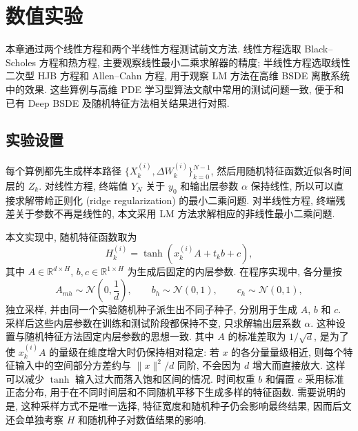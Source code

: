 
\chapter{数值实验}\label{ch:numerical}
  本章通过两个线性方程和两个半线性方程测试前文方法.
  线性方程选取 Black--Scholes 方程和热方程, 主要观察线性最小二乘求解器的精度;
  半线性方程选取线性二次型 HJB 方程和 Allen--Cahn 方程,
  用于观察 LM 方法在高维 BSDE 离散系统中的效果.
  这些算例与高维 PDE 学习型算法文献中常用的测试问题一致,
  便于和已有 Deep BSDE 及随机特征方法相关结果进行对照\cite{hanSolvingHighdimensionalPartial2018,chenBridgingTraditionalMachine2022}.

  \section{实验设置}\label{sec:numerical_setup}
    每个算例都先生成样本路径
    $\{X_k^{(i)},\Delta W_k^{(i)}\}_{k=0}^{N-1}$,
    然后用随机特征函数近似各时间层的 $Z_k$.
    对线性方程, 终端值 $Y_N$ 关于 $y_0$ 和输出层参数 $\alpha$ 保持线性,
    所以可以直接求解带岭正则化 (ridge regularization) 的最小二乘问题.
    对半线性方程, 终端残差关于参数不再是线性的, 本文采用 LM 方法求解相应的非线性最小二乘问题.

    本文实现中, 随机特征函数取为
    \begin{equation}
      H_k^{(i)}
      =
      \tanh\!\left(
        x_k^{(i)} A + t_k b + c
      \right),
      \label{eq:numerical_inner_parameter_sampling}
    \end{equation}
    其中 $A\in\mathbb{R}^{d\times H}$,
    $b,c\in\mathbb{R}^{1\times H}$ 为生成后固定的内层参数.
    在程序实现中, 各分量按
    \begin{equation}
      A_{mh}\sim \mathcal{N}\!\left(0,\frac{1}{d}\right),
      \qquad
      b_h\sim \mathcal{N}(0,1),
      \qquad
      c_h\sim \mathcal{N}(0,1),
      \label{eq:numerical_inner_parameter_distribution}
    \end{equation}
    独立采样, 并由同一个实验随机种子派生出不同子种子,
    分别用于生成 $A$, $b$ 和 $c$.
    采样后这些内层参数在训练和测试阶段都保持不变,
    只求解输出层系数 $\alpha$.
    这种设置与随机特征方法固定内层参数的思想一致.
    其中 $A$ 的标准差取为 $1/\sqrt d$,
    是为了使 $x_k^{(i)}A$ 的量级在维度增大时仍保持相对稳定:
    若 $x$ 的各分量量级相近, 则每个特征输入中的空间部分方差约与
    $\lVert x\rVert^2/d$ 同阶, 不会因为 $d$ 增大而直接放大.
    这样可以减少 $\tanh$ 输入过大而落入饱和区间的情况.
    时间权重 $b$ 和偏置 $c$ 采用标准正态分布,
    用于在不同时间层和不同随机平移下生成多样的特征函数.
    需要说明的是, 这种采样方式不是唯一选择,
    特征宽度和随机种子仍会影响最终结果,
    因而后文还会单独考察 $H$ 和随机种子对数值结果的影响.

